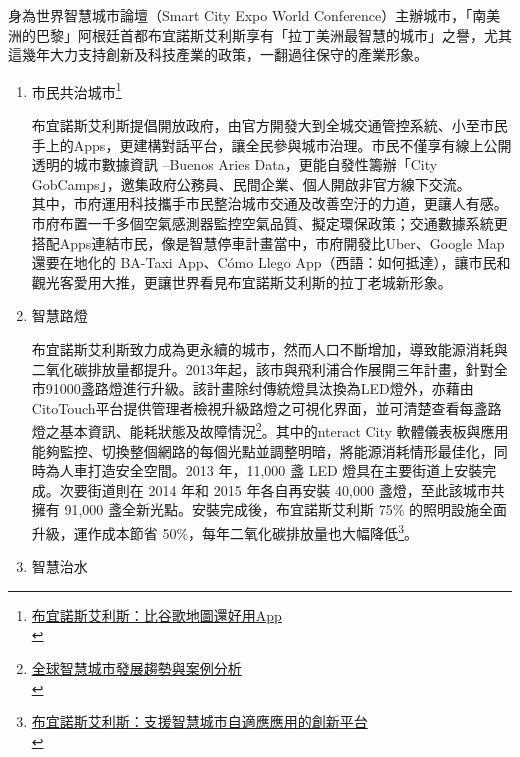 \documentclass[a4paper,12pt]{article}
\begin{document}
\begin{enumerate}
身為世界智慧城市論壇（Smart City Expo World Conference）主辦城市，「南美洲的巴黎」阿根廷首都布宜諾斯艾利斯享有「拉丁美洲最智慧的城市」之譽，尤其這幾年大力支持創新及科技產業的政策，一翻過往保守的產業形象。\\

\begin{enumerate}
\item 市民共治城市\footnote{\href{https://futurecity.cw.com.tw/article/226}{布宜諾斯艾利斯：比谷歌地圖還好用App}\\}
\label{sec:org14bcfcb}

布宜諾斯艾利斯提倡開放政府，由官方開發大到全城交通管控系統、小至市民手上的Apps，更建構對話平台，讓全民參與城市治理。市民不僅享有線上公開透明的城市數據資訊 –Buenos Aries Data，更能自發性籌辦「City GobCamps」，邀集政府公務員、民間企業、個人開啟非官方線下交流。\\

其中，市府運用科技攜手市民整治城市交通及改善空汙的力道，更讓人有感。市府布置一千多個空氣感測器監控空氣品質、擬定環保政策；交通數據系統更搭配Apps連結市民，像是智慧停車計畫當中，市府開發比Uber、Google Map還要在地化的 BA-Taxi App、Cómo Llego App（西語：如何抵達），讓市民和觀光客愛用大推，更讓世界看見布宜諾斯艾利斯的拉丁老城新形象。\\

\item 智慧路燈
\label{sec:org49d4197}

布宜諾斯艾利斯致力成為更永續的城市，然而人口不斷增加，導致能源消耗與二氧化碳排放量都提升。2013年起，該市與飛利浦合作展開三年計畫，針對全市91000盞路燈進行升級。該計畫除纣傳統燈具汰換為LED燈外，亦藉由CitoTouch平台提供管理者檢視升級路燈之可視化界面，並可清楚查看每盞路燈之基本資訊、能耗狀態及故障情況\footnote{\href{https://mic.iii.org.tw/bookstore/Book.aspx?sqno=878}{全球智慧城市發展趨勢與案例分析}\\}。其中的nteract City 軟體儀表板與應用能夠監控、切換整個網路的每個光點並調整明暗，將能源消耗情形最佳化，同時為人車打造安全空間。2013 年，11,000 盞 LED 燈具在主要街道上安裝完成。次要街道則在 2014 年和 2015 年各自再安裝 40,000 盞燈，至此該城市共擁有 91,000 盞全新光點。安裝完成後，布宜諾斯艾利斯 75\% 的照明設施全面升級，運作成本節省 50\%，每年二氧化碳排放量也大幅降低\footnote{\href{https://www.interact-lighting.com/zh-tw/case-studies/buenos-aires}{布宜諾斯艾利斯：支援智慧城市自適應應用的創新平台}\\}。\\

\item 智慧治水
\label{sec:org117d07e}


\end{enumerate}
\end{enumerate}
\end{document}
